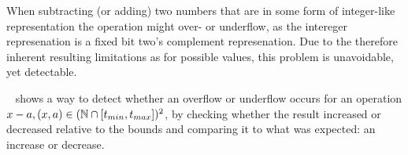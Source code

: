 When subtracting (or adding) two numbers that are in some form of integer-like representation the operation might over- or underflow, as the intereger represenation is a fixed bit two's complement represenation.
Due to the therefore inherent resulting limitations as for possible values, this problem is unavoidable, yet detectable.

~\cite{pmg_2009} shows a way to detect whether an overflow or underflow occurs for an operation $x - a, (x, a) \in (\mathbb{N} \cap {\lbrack t_{min}, t_{max} \rbrack})^2$, by checking whether the result increased or decreased relative to the bounds and comparing it to what was expected: an increase or decrease.


